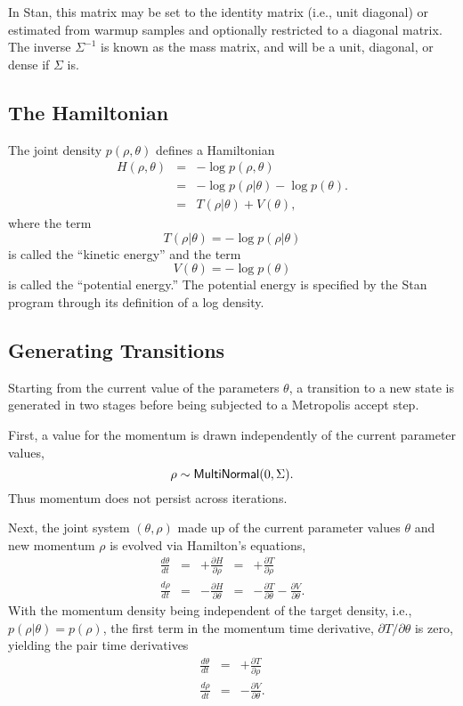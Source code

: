 In Stan, this matrix may be set to the identity matrix (i.e., unit
diagonal) or estimated from warmup samples and optionally restricted
to a diagonal matrix. The inverse $\Sigma^{-1}$ is known as the mass
matrix, and will be a unit, diagonal, or dense if $\Sigma$ is.

\subsection{The Hamiltonian}

The joint density $p(\rho,\theta)$ defines a Hamiltonian
%
\begin{eqnarray*}
H(\rho,\theta) & = & - \log p(\rho,\theta)
\\[3pt]
& = & - \log p(\rho|\theta) - \log p(\theta).
\\[3pt]
& = & T(\rho|\theta) + V(\theta),
\end{eqnarray*}
%
where the term
\[
T(\rho|\theta) = - \log p(\rho | \theta)
\]
is called the ``kinetic energy'' and the term
\[
V(\theta) = - \log p(\theta)
\]
is called the ``potential energy.''  The potential energy is specified
by the Stan program through its definition of a log density.

\subsection{Generating Transitions}

Starting from the current value of the parameters $\theta$, a
transition to a new state is generated in two stages before being
subjected to a Metropolis accept step.

First, a value for the momentum is drawn independently of the current
parameter values,
%
\[
\rho \sim \distro{MultiNormal}(0,\Sigma).
\]
%
Thus momentum does not persist across iterations.

Next, the joint system $(\theta,\rho)$ made up of the current
parameter values $\theta$ and new momentum $\rho$ is evolved
via Hamilton's equations,
%
\[
\begin{array}{rcccl}
\displaystyle
\frac{d\theta}{dt}
& = &
\displaystyle
+ \frac{\partial H}{\partial \rho}
& = &
\displaystyle
+ \frac{\partial T}{\partial \rho}
\\[12pt]
\displaystyle
\frac{d\rho}{dt}
& = &
\displaystyle
- \frac{\partial H}{\partial \theta }
& = &
\displaystyle
- \frac{\partial T}{\partial \theta}
- \frac{\partial V}{\partial \theta}.
\end{array}
\]
%
With the momentum density being independent of the target density,
i.e., $p(\rho|\theta) = p(\rho)$, the first term in the
momentum time derivative, ${\partial T} / {\partial \theta}$ is
zero, yielding the pair time derivatives
%
\begin{eqnarray*}
\frac{d \theta}{d t} & = & +\frac{\partial T}{\partial \rho}
\\[2pt]
\frac{d \rho}{d t} & = & -\frac{\partial V}{\partial \theta}.
\end{eqnarray*}

